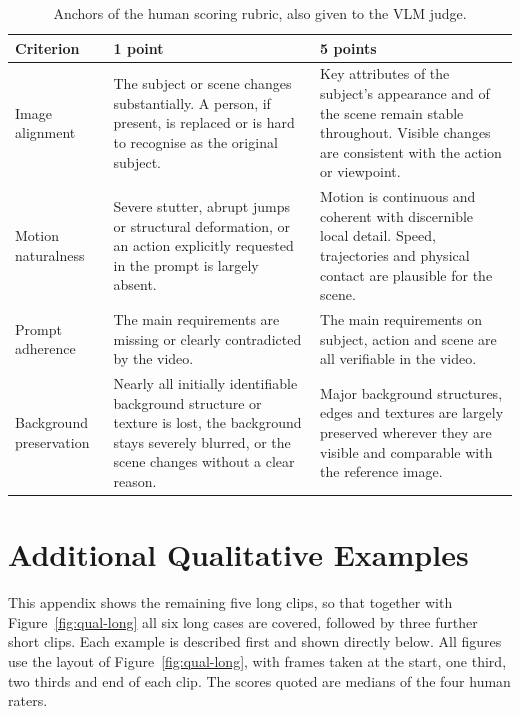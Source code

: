 \documentclass[11pt,a4paper]{article}
\begin{document}
\begin{table}[!htb]
  \centering
  \small
  \caption{Anchors of the human scoring rubric, also given to the VLM judge.}
  \label{tab:rubric}
  \begin{tabularx}{\linewidth}{@{}>{\raggedright\arraybackslash}p{28mm} L L@{}}
    \toprule
    Criterion & 1 point & 5 points \\
    \midrule
    Image alignment &
      The subject or scene changes substantially. A person, if present, is replaced or is hard to recognise as the original subject. &
      Key attributes of the subject's appearance and of the scene remain stable throughout. Visible changes are consistent with the action or viewpoint. \\
    \addlinespace
    Motion naturalness &
      Severe stutter, abrupt jumps or structural deformation, or an action explicitly requested in the prompt is largely absent. &
      Motion is continuous and coherent with discernible local detail. Speed, trajectories and physical contact are plausible for the scene. \\
    \addlinespace
    Prompt adherence &
      The main requirements are missing or clearly contradicted by the video. &
      The main requirements on subject, action and scene are all verifiable in the video. \\
    \addlinespace
    Background preservation &
      Nearly all initially identifiable background structure or texture is lost, the background stays severely blurred, or the scene changes without a clear reason. &
      Major background structures, edges and textures are largely preserved wherever they are visible and comparable with the reference image. \\
    \bottomrule
  \end{tabularx}
\end{table}

\section{Additional Qualitative Examples}
\label{app:extra}
This appendix shows the remaining five long clips, so that together with Figure~\ref{fig:qual-long} all six long cases are covered, followed by three further short clips. Each example is described first and shown directly below. All figures use the layout of Figure~\ref{fig:qual-long}, with frames taken at the start, one third, two thirds and end of each clip. The scores quoted are medians of the four human raters.
\end{document}
